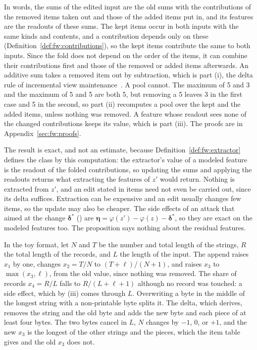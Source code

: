 \noindent In words, the sums of the edited input are the old sums with the contributions of the removed items taken
out and those of the added items put in, and its features are the readouts of these sums. The kept items occur
in both inputs with the same kinds and contents, and a contribution depends only on these
(Definition~\ref{def:fw:contributions}), so the kept items contribute the same to both inputs. Since the fold does not
depend on the order of the items, it can combine their contributions first and those of the removed or added items
afterwards. An additive sum takes a removed item out by subtraction, which is part (i), the delta rule of
incremental view maintenance~\cite{gupta1995maintenance,koch2014dbtoaster}. A pool cannot. The maximum of 5 and 3 and
the maximum of 5 and 5 are both 5, but removing a 5 leaves 3 in the first case and 5 in the second, so part (ii)
recomputes a pool over the kept and the added items, unless nothing was removed. A feature whose readout sees
none of the changed contributions keeps its value, which is part (iii). The proofs are in
Appendix~\ref{sec:fw:proofs}.

The result is exact, and not an estimate, because Definition~\ref{def:fw:extractor} defines the class by this
computation: the extractor's value of a modeled feature is the readout of the folded contributions, so updating the
sums and applying the readouts returns what extracting the features of $z'$ would return. Nothing is extracted from
$z'$, and an edit stated in items need not even be carried out, since its delta suffices. Extraction can
be expensive and an edit usually changes few items, so the update may also be cheaper. The side effects of an attack
that aimed at the change $\boldsymbol{\delta}^*$ () are
$\boldsymbol{\eta} = \varphi(z') - \varphi(z) - \boldsymbol{\delta}^*$, so they are exact on the modeled features too.
The proposition says nothing about the residual features.
\begin{runex}
In the toy format, let $N$ and $T$ be the number and total length of the strings, $R$ the total length of the
records, and $L$ the length of the input. The append raises $x_1$ by one, changes $x_2 = T/N$ to
$(T + \ell)/(N + 1)$, and raises $x_3$ to $\max(x_3, \ell)$, from the old value, since nothing was removed. The share
of records $x_4 = R/L$ falls to $R/(L + \ell + 1)$ although no record was touched: a side effect, which by (iii)
comes through $L$. Overwriting a byte in the middle of the longest string with a non-printable byte splits it. The
delta, which  derives, removes the string and the old byte and adds the new byte and each piece of
at least four bytes. The two bytes cancel in $L$, $N$ changes by $-1$, $0$, or $+1$, and the new $x_3$ is the longest
of the other strings and the pieces, which the item table gives and the old $x_3$ does not.
\end{runex}


